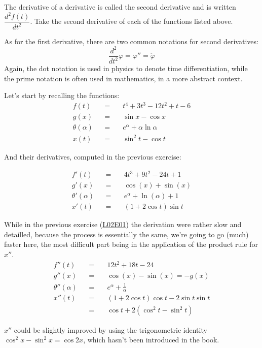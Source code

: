 \documentclass[solutions.tex]{subfiles}
\begin{document}
\maketitle
\begin{exercise} The derivative of a derivative is called the
second derivative and is written $\dfrac{d^2 f(t)}{dt^2}$. Take
the second derivative of each of the functions listed above.
\end{exercise}
\begin{remark} As for the first derivative, there are
two common notations for second derivatives:
\[
	\frac{d^2}{dt^2}\varphi = \varphi'' = \ddot\varphi
\]
Again, the dot notation is used in physics to denote time differentiation,
while the prime notation is often used in mathematics, in a more abstract context.
\end{remark}
Let's start by recalling the functions:
\begin{equation*} \begin{aligned}
	f(t) &&=\quad& t^4 + 3t^3 - 12t^2 + t - 6 \\
	g(x) &&=\quad& \sin x - \cos x \\
	\theta(\alpha) &&=\quad& e^\alpha + \alpha\ln\alpha \\
	x(t) &&=\quad& \sin^2t - \cos t
\end{aligned} \end{equation*}

And their derivatives, computed in the previous exercise:

\begin{equation*} \begin{aligned}
	f'(t)  &&=\quad& 4t^3 + 9t^2-24t+1 \\
	g'(x) &&=\quad& \cos(x)+\sin(x) \\
	\theta'(\alpha) &&=\quad& e^\alpha+\ln(\alpha)+1 \\
	x'(t) &&=\quad& (1+2\cos t)\sin t
\end{aligned} \end{equation*}

While in the previous exercise
(\href{https://github.com/mbivert/ttm/blob/master/cm/L02E01.pdf}{L02E01})
the derivation were rather slow and detailled, because the process
is essentially the same, we're going to go (much) faster here, the most
difficult part being in the application of the product rule for $x''$.
\begin{equation*} \begin{aligned}
	f''(t)  &&=\quad& \boxed{12t^2 + 18t-24} \\
	g''(x) &&=\quad& \boxed{\cos(x)-\sin(x) = -g(x)} \\
	\theta''(\alpha) &&=\quad& \boxed{e^\alpha+\frac{1}\alpha} \\
	x''(t) &&=\quad& (1+2\cos t)\cos t -2\sin t\sin t \\
	~ &&=\quad& \boxed{\cos t +2(\cos^2 t - \sin^2t)}
\end{aligned} \end{equation*}
\begin{remark} $x''$ could be slightly improved by using
the trigonometric identity $\cos^2x-\sin^2x = \cos2x$, which hasn't
been introduced in the book.
\end{remark}
\end{document}
